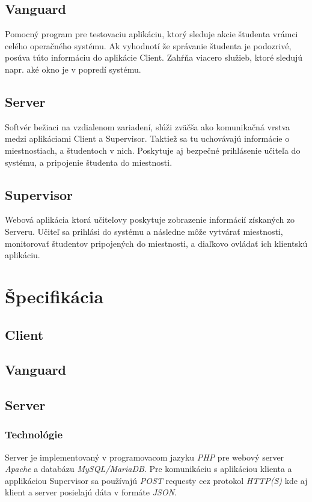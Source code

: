 \documentclass{article}
\begin{document}
\subsection{Vanguard}

Pomocný program pre testovaciu aplikáciu, ktorý sleduje akcie študenta vrámci celého operačného systému. Ak vyhodnotí že správanie študenta je podozrivé, posúva túto informáciu do aplikácie Client. Zahŕňa viacero služieb, ktoré sledujú napr. aké okno je v popredí systému.

\subsection{Server}

Softvér bežiaci na vzdialenom zariadení, slúži zväčša ako komunikačná vrstva medzi aplikáciami Client a Supervisor. Taktiež sa tu uchovávajú informácie o miestnostiach, a študentoch v nich. Poskytuje aj bezpečné prihlásenie učiteľa do systému, a pripojenie študenta do miestnosti.

\subsection{Supervisor}

Webová aplikácia ktorá učiteľovy poskytuje zobrazenie informácií získaných zo Serveru. Učiteľ sa prihlási do systému a následne môže vytvárať miestnosti, monitorovať študentov pripojených do miestnosti, a diaľkovo ovládať ich klientskú aplikáciu.

\section{Špecifikácia}

\subsection{Client}

\subsection{Vanguard}

\subsection{Server}

\subsubsection{Technológie}
Server je implementovaný v programovacom jazyku \emph{PHP} pre webový server \emph{Apache} a databázu \emph{MySQL/MariaDB}.
\newline
Pre komunikáciu s aplikáciou klienta a applikáciou Supervisor sa používajú \emph{POST} requesty cez protokol \emph{HTTP(S)} kde aj klient a server posielajú dáta v formáte \emph{JSON}.
\end{document}
